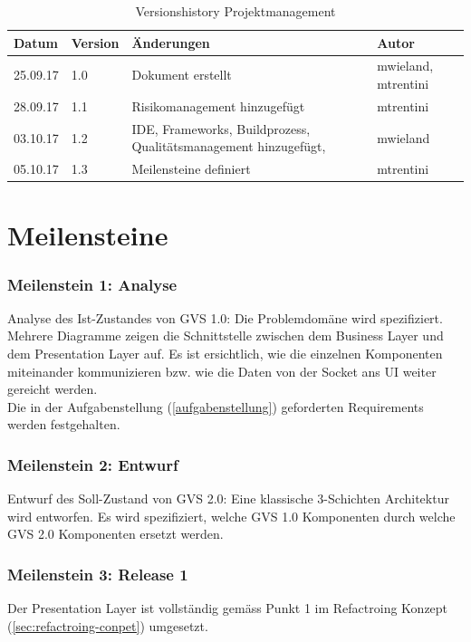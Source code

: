 \documentclass[11pt,a4paper,english,oneside]{book}
\numberwithin{equation}{chapter}
\begin{document}
	
	\begin{table}[h!]
		\centering
		\begin{tabularx}{\linewidth}{l l X l}
			\toprule 
			Datum & Version & Änderungen & Autor \\
			\midrule
			25.09.17 & 1.0 & Dokument erstellt & mwieland, mtrentini \\
			28.09.17 & 1.1 & Risikomanagement hinzugefügt & mtrentini \\
			03.10.17 & 1.2 & IDE, Frameworks, Buildprozess, Qualitätsmanagement hinzugefügt, & mwieland \\
			05.10.17 & 1.3 & Meilensteine definiert & mtrentini \\
			\bottomrule 
		\end{tabularx} 
		\caption{Versionshistory Projektmanagement} 
	\end{table}
	
	\section{Meilensteine}
	\label{sec:milestones}
	
	\subsubsection{Meilenstein 1: Analyse}
	Analyse des Ist-Zustandes von GVS 1.0: Die Problemdomäne wird spezifiziert. Mehrere Diagramme zeigen die Schnittstelle zwischen dem Business Layer und dem Presentation Layer auf. Es ist ersichtlich, wie die einzelnen Komponenten miteinander kommunizieren bzw. wie die Daten von der Socket ans UI weiter gereicht werden.\\
	Die in der Aufgabenstellung (\ref{aufgabenstellung}) geforderten Requirements werden festgehalten.
	
	\subsubsection{Meilenstein 2: Entwurf}
	\label{milestone2}
	Entwurf des Soll-Zustand von GVS 2.0: Eine klassische 3-Schichten Architektur wird entworfen. Es wird spezifiziert, welche GVS 1.0 Komponenten durch welche GVS 2.0 Komponenten ersetzt werden. 
	
	\subsubsection{Meilenstein 3: Release 1}
	Der Presentation Layer ist vollständig gemäss Punkt 1 im Refactroing Konzept (\ref{sec:refactroing-conpet}) umgesetzt.
	
\end{document}
